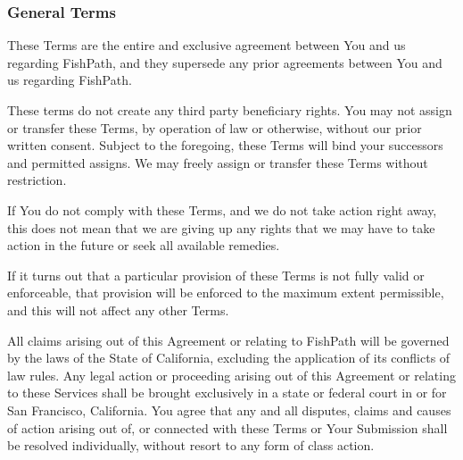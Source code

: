 \documentclass[11pt,]{book}
\begin{document}
\hypertarget{general-terms}{%
\subsubsection*{General Terms}\label{general-terms}}

These Terms are the entire and exclusive agreement between You and us regarding FishPath, and they supersede any prior agreements between You and us regarding FishPath.

These terms do not create any third party beneficiary rights. You may not assign or transfer these Terms, by operation of law or otherwise, without our prior written consent. Subject to the foregoing, these Terms will bind your successors and permitted assigns. We may freely assign or transfer these Terms without restriction.

If You do not comply with these Terms, and we do not take action right away, this does not mean that we are giving up any rights that we may have to take action in the future or seek all available remedies.

If it turns out that a particular provision of these Terms is not fully valid or enforceable, that provision will be enforced to the maximum extent permissible, and this will not affect any other Terms.

All claims arising out of this Agreement or relating to FishPath will be governed by the laws of the State of California, excluding the application of its conflicts of law rules. Any legal action or proceeding arising out of this Agreement or relating to these Services shall be brought exclusively in a state or federal court in or for San Francisco, California. You agree that any and all disputes, claims and causes of action arising out of, or connected with these Terms or Your Submission shall be resolved individually, without resort to any form of class action.


\end{document}

